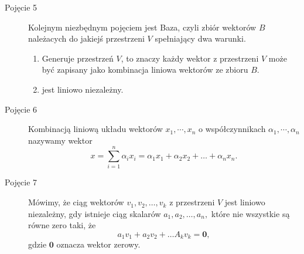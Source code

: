 \documentclass[a4paper,12pt]{book} %
\begin{document}
\begin{description}
\item [Pojęcie 5] Kolejnym niezbędnym pojęciem jest Baza, czyli zbiór wektorów $B$ należacych do jakiejś przestrzeni $V$ spełniający dwa warunki.
\begin{enumerate}
\item Generuje przestrzeń $V$, to znaczy każdy wektor z przestrzeni $V$ może być zapisany jako kombinacja liniowa wektorów ze zbioru $B.$
\item jest liniowo niezależny.
\end{enumerate}

\item [Pojęcie 6] Kombinacją liniową układu wektorów $x_1, \cdots,x_n$ o współczynnikach $\alpha_1,\cdots,\alpha_n$ nazywamy wektor
$$ x = \sum_{i=1}^n\alpha_ix_i = \alpha_1x_1 + \alpha_2x_2 + \ldots + \alpha_nx_n.$$

\item [Pojęcie 7] Mówimy, że ciąg wektorów $v_1, v_2, \ldots, v_k$ z przestrzeni $V$ jest liniowo niezależny, gdy istnieje ciąg skalarów $a_1, a_2, \ldots, a_n,$ które nie wszystkie są równe zero taki, że 
$$ a_1v_1 + a_2v_2 + \ldots A_kv_k = \mathbf{0}, $$
gdzie $\mathbf{0}$ oznacza wektor zerowy.
\end{description}
\end{document}
